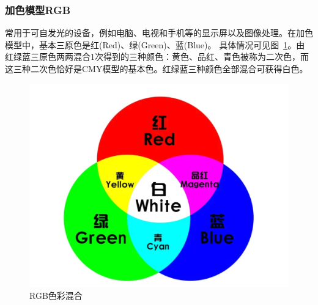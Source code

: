 \documentclass{ctexart}
\begin{document}
\subsubsection{加色模型RGB}
常用于可自发光的设备，例如电脑、电视和手机等的显示屏以及图像处理。在加色模型中，基本三原色是红(Red)、绿(Green)、蓝(Blue)。
具体情况可见图~\ref{fig_rgb}。由红绿蓝三原色两两混合1次得到的三种颜色：黄色、品红、青色被称为二次色，而这三种二次色恰好是CMY模型的基本色。红绿蓝三种颜色全部混合可获得白色。
\begin{figure}[h!]
    \centering
    \includegraphics[width=.8\linewidth]{imgs/RGB.png}
    \caption{RGB色彩混合}
    \label{fig_rgb}
\end{figure}
\end{document}
